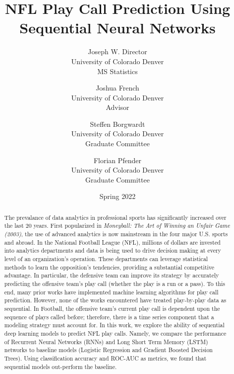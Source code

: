 \documentclass[11pt]{article}
\title{NFL Play Call Prediction Using Sequential Neural Networks}
\author{Joseph W. Director  \\
	University of Colorado Denver \\
    MS Statistics
	\and 
	Joshua French \\
    University of Colorado Denver \\
    Advisor
    \and
    Steffen Borgwardt \\
    University of Colorado Denver \\
    Graduate Committee
    \and
    Florian Pfender \\
    University of Colorado Denver \\
    Graduate Committee
	}
\date{Spring 2022}
\begin{document}
    
    \maketitle

    \begin{abstract}
        \centering\begin{minipage}{\dimexpr\paperwidth-12cm}
        The prevalance of data analytics in professional sports has significantly increased over the last 20 years. 
        First popularized in \emph{Moneyball: The Art of Winning an Unfair Game (2003)}, the use of advanced analytics is now mainstream in the four major U.S. sports and abroad. 
        In the National Football League (NFL), millions of dollars are invested into analytics departments and data is being used to drive decision making at every level of an organization's operation. 
        These departments can leverage statistical methods to learn the opposition's tendencies, providing a substantial competitive advantage. 
        In particular, the defensive team can improve its strategy by accurately predicting the offensive team's play call (whether the play is a run or a pass). 
        To this end, many prior works have implemented machine learning algorithms for play call prediction. 
        However, none of the works encountered have treated play-by-play data as sequential. 
        In Football, the offensive team's current play call is dependent upon the sequence of plays called before; therefore, there is a time series component that a modeling strategy must account for. 
        In this work, we explore the ability of sequential deep learning models to predict NFL play calls.
        Namely, we compare the performance of Recurrent Neural Networks (RNNs) and Long Short Term Memory (LSTM) networks to baseline models (Logistic Regression and Gradient Boosted Decision Trees). 
        Using classification accuracy and ROC-AUC as metrics, we found that sequential models out-perform the baseline. 
        \end{minipage}
    \end{abstract}
    
    \pagebreak

    \tableofcontents
    \newpage
    \listoffigures
    \newpage
    \listoftables
    \newpage

\end{document}
